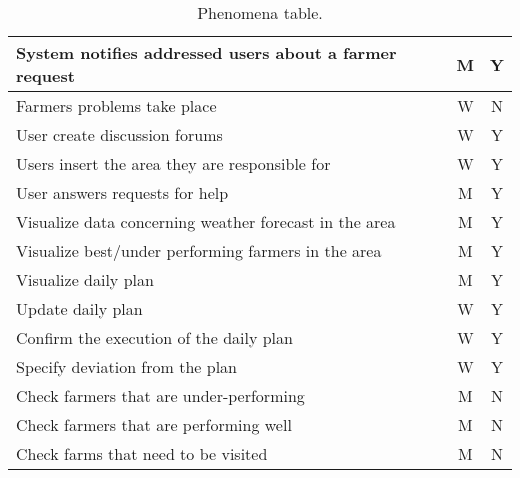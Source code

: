 \begin{table}[H]
\begin{tabular}{|l|c|c|}
        \hline
        System notifies addressed users about a farmer request          &   M   &   Y \\
        \hline
        Farmers problems take place                                     &   W   &   N \\
        \hline
        User create discussion forums                                   &   W   &   Y \\
        \hline
        Users insert the area they are responsible for                  &   W   &   Y \\
        \hline
        User answers requests for help                                  &   M   &   Y \\
        \hline
        Visualize data concerning weather forecast in the area          &   M   &   Y \\
        \hline
        Visualize best/under performing farmers in the area             &   M   &   Y \\
        \hline
        Visualize daily plan                                            &   M   &   Y \\
        \hline
        Update daily plan                                               &   W   &   Y \\
        \hline
        Confirm the execution of the daily plan                         &   W   &   Y \\
        \hline
        Specify deviation from the plan                                 &   W   &   Y \\
        \hline
        Check farmers that are under-performing                         &   M   &   N \\
        \hline
        Check farmers that are performing well                          &   M   &   N \\
        \hline
        Check farms that need to be visited                             &   M   &   N \\
        \hline
    \end{tabular}
    
    \caption{\label{tab:phenomena_table}Phenomena table.}
    
\end{table}

